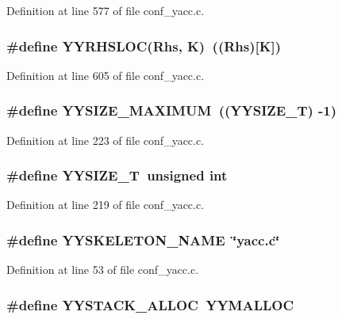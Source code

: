 Definition at line 577 of file conf\_\-yacc.c.
\subsubsection[{YYRHSLOC}]{\setlength{\rightskip}{0pt plus 5cm}\#define YYRHSLOC(Rhs, \/  K)~((Rhs)[K])}\label{conf__yacc_8c_b2b4f027a2b092ac14ca4464e7b3db60}




Definition at line 605 of file conf\_\-yacc.c.
\subsubsection[{YYSIZE\_\-MAXIMUM}]{\setlength{\rightskip}{0pt plus 5cm}\#define YYSIZE\_\-MAXIMUM~((YYSIZE\_\-T) -1)}\label{conf__yacc_8c_b4bb7ad82d4a7e2df49ff6a8fb484109}




Definition at line 223 of file conf\_\-yacc.c.
\subsubsection[{YYSIZE\_\-T}]{\setlength{\rightskip}{0pt plus 5cm}\#define YYSIZE\_\-T~unsigned int}\label{conf__yacc_8c_7d535939e93253736c6eeda569d24de5}




Definition at line 219 of file conf\_\-yacc.c.
\subsubsection[{YYSKELETON\_\-NAME}]{\setlength{\rightskip}{0pt plus 5cm}\#define YYSKELETON\_\-NAME~\char`\"{}yacc.c\char`\"{}}\label{conf__yacc_8c_50db5aef8c2b6f13961b2480b37f84c0}




Definition at line 53 of file conf\_\-yacc.c.
\subsubsection[{YYSTACK\_\-ALLOC}]{\setlength{\rightskip}{0pt plus 5cm}\#define YYSTACK\_\-ALLOC~YYMALLOC}\label{conf__yacc_8c_f45042ce56e04d634420d76caeb2ee73}




